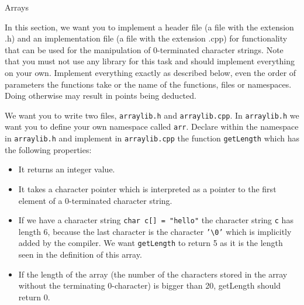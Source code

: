 \documentclass[12pt,a4paper]{scrartcl}
\begin{document}
\begin{aufgabe}[13]{Arrays}

    In this section, we want you to implement a header file (a file with the extension .h) and an implementation file (a file with the extension .cpp) for functionality that can be used for the manipulation of 0-terminated character strings.
    \newline
    \newline Note that you must not use any library for this task and should implement everything on your own.
    \newline
    \newline Implement everything exactly as described below, even the order of parameters the functions take or the name of the functions, files or namespaces. Doing otherwise may result in points being deducted.

	\begin{teilaufgabe}[3]
            We want you to write two files, \texttt{arraylib.h} and \texttt{arraylib.cpp}. In \texttt{arraylib.h} we want you to define your own namespace called \texttt{arr}. Declare within the namespace in \texttt{arraylib.h} and implement in \texttt{arraylib.cpp} the function \texttt{getLength} which has the following properties:
            \begin{itemize}
                \item It returns an integer value.
                \item It takes a character pointer which is interpreted as a pointer to the first element of a 0-terminated character string.
                \item If we have a character string \texttt{char c[] = "hello"} the character string \texttt{c} has length 6, because the last character is the character \texttt{'\textbackslash 0'} which is implicitly added by the compiler. We want \texttt{getLength} to return 5 as it is the length seen in the definition of this array.
                \item If the length of the array (the number of the characters stored in the array without the terminating 0-character) is bigger than 20, getLength should return 0.
            \end{itemize}
        \end{teilaufgabe}


\end{aufgabe}
\end{document}
